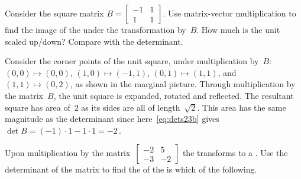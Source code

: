 \begin{example} \label{eg:detarea2}
Consider the square matrix \(B=\begin{bmatrix} -1&1\\1&1 \end{bmatrix}\).
Use matrix-vector multiplication to find the image of the  under the transformation by~\(B\).
How much is the unit  scaled up/down?  
Compare with the determinant.
\begin{solution} 
Consider the corner points of the unit square, under multiplication by~\(B\): 
%
\((0,0)\mapsto(0,0)\)\index{$\mapsto$}, \((1,0)\mapsto(-1,1)\), \((0,1)\mapsto(1,1)\), and \((1,1)\mapsto(0,2)\), as shown in the marginal picture.
Through multiplication by the matrix~\(B\), the unit square is expanded, rotated and reflected.
The resultant square has area of~\(2\) as its sides are all of length~\(\sqrt2\).
This area has the same magnitude as the determinant since here~\eqref{eq:dets23b} gives \(\det B=(-1)\cdot1-1\cdot1=-2\)\,.
\end{solution}
\end{example}



\begin{activity}
Upon multiplication by the matrix~\(\begin{bmatrix} -2&5\\-3&-2 \end{bmatrix}\) the  transforms to a .
Use the determinant of the matrix to find the  of the  is which of the following.
\end{activity}



